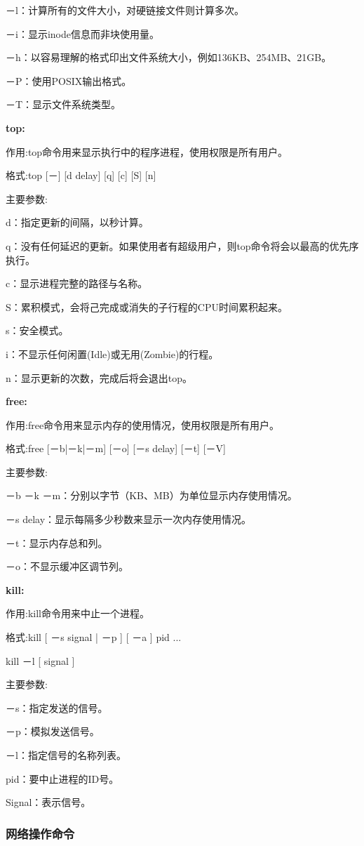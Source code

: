 －l：计算所有的文件大小，对硬链接文件则计算多次。

－i：显示inode信息而非块使用量。

－h：以容易理解的格式印出文件系统大小，例如136KB、254MB、21GB。

－P：使用POSIX输出格式。

－T：显示文件系统类型。

\textbf{top:}

作用:top命令用来显示执行中的程序进程，使用权限是所有用户。

格式:top [－] [d delay] [q] [c] [S] [n]

主要参数:

d：指定更新的间隔，以秒计算。

q：没有任何延迟的更新。如果使用者有超级用户，则top命令将会以最高的优先序执行。

c：显示进程完整的路径与名称。

S：累积模式，会将己完成或消失的子行程的CPU时间累积起来。

s：安全模式。

i：不显示任何闲置(Idle)或无用(Zombie)的行程。

n：显示更新的次数，完成后将会退出top。

\textbf{free:}

作用:free命令用来显示内存的使用情况，使用权限是所有用户。

格式:free [－b|－k|－m] [－o] [－s delay] [－t] [－V]

主要参数:

－b －k －m：分别以字节（KB、MB）为单位显示内存使用情况。

－s delay：显示每隔多少秒数来显示一次内存使用情况。

－t：显示内存总和列。

－o：不显示缓冲区调节列。

\textbf{kill:}

作用:kill命令用来中止一个进程。

格式:kill [ －s signal | －p ] [ －a ] pid ...

kill －l [ signal ]

主要参数:

－s：指定发送的信号。

－p：模拟发送信号。

－l：指定信号的名称列表。

pid：要中止进程的ID号。

Signal：表示信号。

\subsubsection{网络操作命令}

